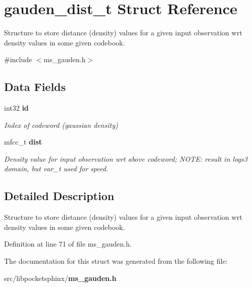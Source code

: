 \section{gauden\+\_\+dist\+\_\+t Struct Reference}
\label{structgauden__dist__t}


Structure to store distance (density) values for a given input observation wrt density values in some given codebook.  




{\ttfamily \#include $<$ms\+\_\+gauden.\+h$>$}

\subsection*{Data Fields}
\begin{DoxyCompactItemize}
\item 
int32 {\bf id}\label{structgauden__dist__t_a93e978149bae5b5bf089769458c42ee4}

\begin{DoxyCompactList}\small\item\em Index of codeword (gaussian density) \end{DoxyCompactList}\item 
mfcc\+\_\+t {\bf dist}\label{structgauden__dist__t_ab08100d4953998dad76bfcf30864c0c5}

\begin{DoxyCompactList}\small\item\em Density value for input observation wrt above codeword; N\+O\+T\+E\+: result in logs3 domain, but var\+\_\+t used for speed. \end{DoxyCompactList}\end{DoxyCompactItemize}


\subsection{Detailed Description}
Structure to store distance (density) values for a given input observation wrt density values in some given codebook. 

Definition at line 71 of file ms\+\_\+gauden.\+h.



The documentation for this struct was generated from the following file\+:\begin{DoxyCompactItemize}
\item 
src/libpocketsphinx/{\bf ms\+\_\+gauden.\+h}\end{DoxyCompactItemize}
